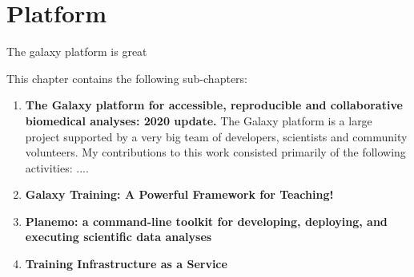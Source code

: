 \cleartorightpage

\chapter{Platform}\label{chapter:platform}

\setcounter{figure}{-1}
\setcounter{table}{-1}
\setcounter{section}{-1}

The galaxy platform is great

This chapter contains the following sub-chapters:

\begin{enumerate}[label=\ref{chapter:training}.\arabic*]
\itemsep-0.5em
\setcounter{enumi}{-1}
\item \textbf{The Galaxy platform for accessible, reproducible and collaborative biomedical analyses: 2020 update.} The Galaxy platform is a large project supported by a very big team of developers, scientists and community volunteers. My contributions to this work consisted primarily of the following activities: ....
\item \textbf{Galaxy Training: A Powerful Framework for Teaching!}
\item \textbf{Planemo: a command-line toolkit for developing, deploying, and executing scientific data analyses}
\item \textbf{Training Infrastructure as a Service}
\end{enumerate}
